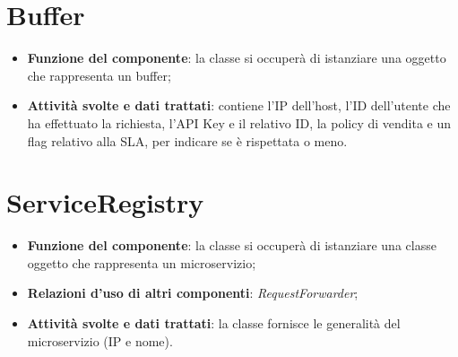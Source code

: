 \chapter{\textbf{Buffer}}
\begin{itemize}
	\item \textbf{Funzione del componente}: la classe si occuper\`{a} di istanziare una oggetto che rappresenta un buffer;
	\item \textbf{Attivit\`{a} svolte e dati trattati}: contiene l'IP dell'host, l'ID dell'utente che ha effettuato la richiesta, l'API Key e il relativo ID, la policy di vendita e un flag relativo alla SLA, per indicare se è rispettata o meno.
\end{itemize}

\chapter{\textbf{ServiceRegistry}}
\begin{itemize}
	\item \textbf{Funzione del componente}: la classe si occuper\`{a} di istanziare una classe oggetto che rappresenta un microservizio;
	\item \textbf{Relazioni d'uso di altri componenti}: \textit{RequestForwarder};
	\item \textbf{Attivit\`{a} svolte e dati trattati}: la classe fornisce le generalit\`{a} del microservizio (IP e nome).
\end{itemize}